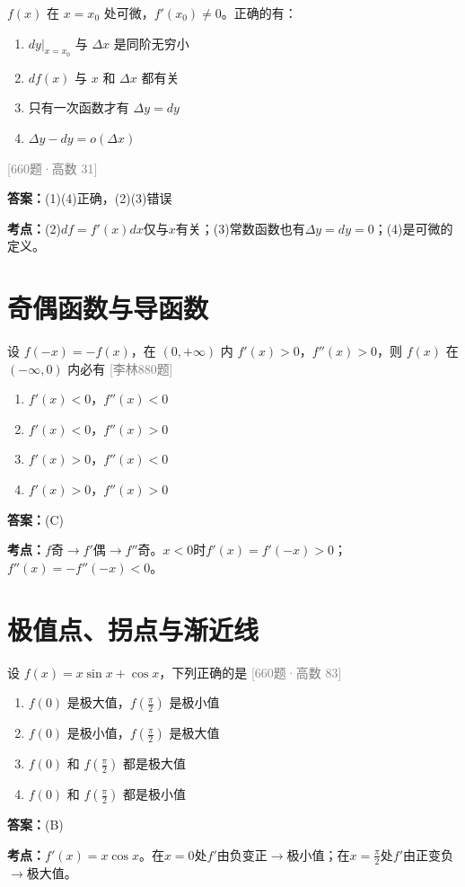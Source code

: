 \documentclass[12pt,a4paper]{ctexbook}
\newcommand{\src}[1]{\hfill\textcolor{gray}{\small\textsf{[#1]}}}
\newcommand{\ans}[1]{\begin{answerbox}\textbf{答案：}#1\end{answerbox}}
\newcommand{\kpt}[1]{\textbf{考点：}#1}
\begin{document}
\begin{exercise}[660题·微分与增量命题]
$f(x)$ 在 $x=x_0$ 处可微，$f'(x_0)\neq 0$。正确的有：
\begin{enumerate}[label=(\arabic*),nosep]
  \item $dy|_{x=x_0}$ 与 $\Delta x$ 是同阶无穷小
  \item $df(x)$ 与 $x$ 和 $\Delta x$ 都有关
  \item 只有一次函数才有 $\Delta y=dy$
  \item $\Delta y-dy=o(\Delta x)$
\end{enumerate}
\src{660题·高数 31}
\end{exercise}
\ans{(1)(4)正确，(2)(3)错误}
\kpt{(2)$df=f'(x)dx$仅与$x$有关；(3)常数函数也有$\Delta y=dy=0$；(4)是可微的定义。}

\section{奇偶函数与导函数}

\begin{exercise}[880题·奇函数导数符号]
设 $f(-x)=-f(x)$，在 $(0,+\infty)$ 内 $f'(x)>0$，$f''(x)>0$，则 $f(x)$ 在 $(-\infty,0)$ 内必有 \hfill\src{李林880题}
\begin{enumerate}[label=(\Alph*),nosep]
  \item $f'(x)<0$，$f''(x)<0$
  \item $f'(x)<0$，$f''(x)>0$
  \item $f'(x)>0$，$f''(x)<0$
  \item $f'(x)>0$，$f''(x)>0$
\end{enumerate}
\end{exercise}
\ans{(C)}
\kpt{$f$奇$\to f'$偶$\to f''$奇。$x<0$时$f'(x)=f'(-x)>0$；$f''(x)=-f''(-x)<0$。}

\section{极值点、拐点与渐近线}

\begin{exercise}[660题·极值点判定]
设 $f(x)=x\sin x+\cos x$，下列正确的是 \hfill\src{660题·高数 83}
\begin{enumerate}[label=(\Alph*),nosep]
  \item $f(0)$ 是极大值，$f(\frac{\pi}{2})$ 是极小值
  \item $f(0)$ 是极小值，$f(\frac{\pi}{2})$ 是极大值
  \item $f(0)$ 和 $f(\frac{\pi}{2})$ 都是极大值
  \item $f(0)$ 和 $f(\frac{\pi}{2})$ 都是极小值
\end{enumerate}
\end{exercise}
\ans{(B)}
\kpt{$f'(x)=x\cos x$。在$x=0$处$f'$由负变正$\to$极小值；在$x=\frac{\pi}{2}$处$f'$由正变负$\to$极大值。}
\end{document}
